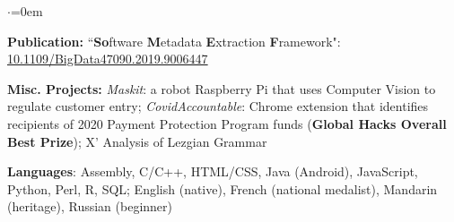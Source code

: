 \begin{list}{$\cdot$}{\leftmargin=0em} %
   \item \textbf{Publication:} ``\textbf{So}ftware \textbf{M}etadata \textbf{E}xtraction \textbf{F}ramework": \href{https://doi.org/10.1109/BigData47090.2019.9006447}{10.1109/BigData47090.2019.9006447}
   \item \textbf{Misc. Projects:} \textit{Maskit}: a robot Raspberry Pi that uses Computer Vision to regulate customer entry; \textit{CovidAccountable}: Chrome extension that identifies recipients of 2020 Payment Protection Program funds (\textbf{Global Hacks Overall Best Prize}); X' Analysis of Lezgian Grammar
   \item \textbf{Languages}: Assembly, C/C++, HTML/CSS, Java (Android), JavaScript, Python, Perl, R, SQL; English (native), French (national medalist), Mandarin (heritage), Russian (beginner)
\end{list}
